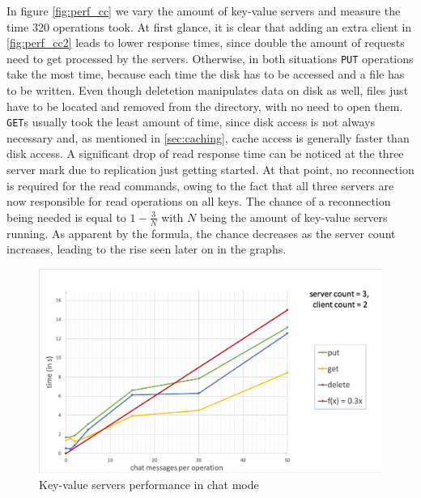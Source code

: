 In figure \ref{fig:perf_cc}  we vary the amount of key-value servers and measure the time 320 operations took. At first glance, it is clear that adding an extra client in \ref{fig:perf_cc2} leads to lower response times, since double the amount of requests need to get processed by the servers. Otherwise, in both situations \texttt{PUT} operations take the most time, because each time the disk has to be accessed and a file has to be written. Even though deletetion manipulates data on disk as well, files just have to be located and removed from the directory, with no need to open them. \texttt{GET}s usually took the least amount of time, since disk access is not always necessary and, as mentioned in \ref{sec:caching}, cache access is generally faster than disk access.
A significant drop of read response time can be noticed at the three server mark due to replication just getting started. At that point, no reconnection is required for the read commands, owing to the fact that all three servers are now responsible for read operations on all keys. The chance of a reconnection being needed is equal to \begin{math}1-\frac{3}{N}\end{math} with \begin{math}N\end{math} being the amount of key-value servers running. As apparent by the formula, the chance decreases as the server count increases, leading to the rise seen later on in the graphs. 

\begin{figure}[h]
	\centering
	\includegraphics[width=\linewidth]{figures/performance/chat(linear).png}
	\caption{Key-value servers performance in chat mode}
	\label{fig:perf_chat_lin}
\end{figure}

